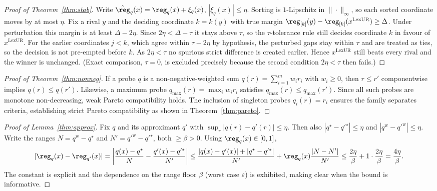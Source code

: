\begin{proof}[Proof of Theorem~\ref{thm:stab}]
Write $\hat\reg_q(x)=\reg_q(x)+\xi_q(x)$, $|\xi_q(x)|\le\eta$. Sorting is
$1$-Lipschitz in $\|\cdot\|_\infty$, so each sorted coordinate moves by at most
$\eta$. Fix a rival $y$ and the deciding coordinate $k=k(y)$ with true margin
$\reg_{[k]}(y)-\reg_{[k]}(x^{\mathrm{LexUR}})\ge\Delta$. Under perturbation this
margin is at least $\Delta-2\eta$. Since $2\eta<\Delta-\tau$ it stays above
$\tau$, so the $\tau$-tolerance rule still decides coordinate $k$ in favour of
$x^{\mathrm{LexUR}}$. For the earlier coordinates $j<k$, which agree within
$\tau-2\eta$ by hypothesis, the perturbed gaps stay within $\tau$ and are treated
as ties, so the decision is not pre-empted before $k$. As $2\eta<\tau$ no spurious
strict difference is created earlier. Hence $x^{\mathrm{LexUR}}$ still beats every
rival and the winner is unchanged. (Exact comparison, $\tau=0$, is excluded
precisely because the second condition $2\eta<\tau$ then fails.)
\end{proof}

\begin{proof}[Proof of Theorem~\ref{thm:nonneg}]
If a probe $q$ is a non-negative-weighted sum $q(r)=\sum_{i=1}^m w_i r_i$ with $w_i\ge 0$, then $r\le r'$ componentwise implies $q(r)\le q(r')$. Likewise, a maximum probe $q_{\max}(r)=\max_{i} w_i r_i$ satisfies $q_{\max}(r)\le q_{\max}(r')$. Since all such probes are monotone non-decreasing, weak Pareto compatibility holds. The inclusion of singleton probes $q_i(r)=r_i$ ensures the family separates criteria, establishing strict Pareto compatibility as shown in Theorem~\ref{thm:pareto}.
\end{proof}

\begin{proof}[Proof of Lemma~\ref{thm:approx}]
Fix $q$ and its approximant $q'$ with $\sup_r|q(r)-q'(r)|\le\eta$. Then also
$|q^\star-q'^\star|\le\eta$ and $|q^{\mathrm w}-q'^{\mathrm w}|\le\eta$. Write the
ranges $N=q^{\mathrm w}-q^\star$ and $N'=q'^{\mathrm w}-q'^\star$, both
$\ge\beta>0$. Using $\reg_q(x)\in[0,1]$,
\[
|\reg_q(x)-\reg_{q'}(x)|
=\left|\frac{q(x)-q^\star}{N}-\frac{q'(x)-q'^\star}{N'}\right|
\le\frac{|q(x)-q'(x)|+|q^\star-q'^\star|}{N'}+\reg_q(x)\frac{|N-N'|}{N'}
\le\frac{2\eta}{\beta}+1\cdot\frac{2\eta}{\beta}=\frac{4\eta}{\beta}.
\]
The constant is explicit and the dependence on the range floor $\beta$ (worst
case $\varepsilon$) is exhibited, making clear when the bound is informative.
\end{proof}

